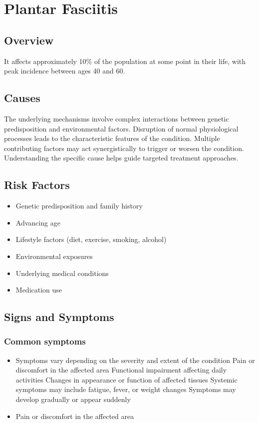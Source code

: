 \chapter{Plantar Fasciitis}
\label{sec:Plantar Fasciitis}

\section{Overview}
It affects approximately 10\% of the population at some point in their life, with peak incidence between ages 40 and 60.
\section{Causes}
The underlying mechanisms involve complex interactions between genetic predisposition and environmental factors. Disruption of normal physiological processes leads to the characteristic features of the condition. Multiple contributing factors may act synergistically to trigger or worsen the condition. Understanding the specific cause helps guide targeted treatment approaches.
\section{Risk Factors}


\begin{itemize}[noitemsep]
  \item Genetic predisposition and family history
  \item Advancing age
  \item Lifestyle factors (diet, exercise, smoking, alcohol)
  \item Environmental exposures
  \item Underlying medical conditions
  \item Medication use
\end{itemize}
\section{Signs and Symptoms}

\subsection{Common symptoms}
\begin{itemize}[noitemsep]
  \item Symptoms vary depending on the severity and extent of the condition Pain or discomfort in the affected area Functional impairment affecting daily activities Changes in appearance or function of affected tissues Systemic symptoms may include fatigue, fever, or weight changes Symptoms may develop gradually or appear suddenly
  \item Pain or discomfort in the affected area
  \end{itemize}

